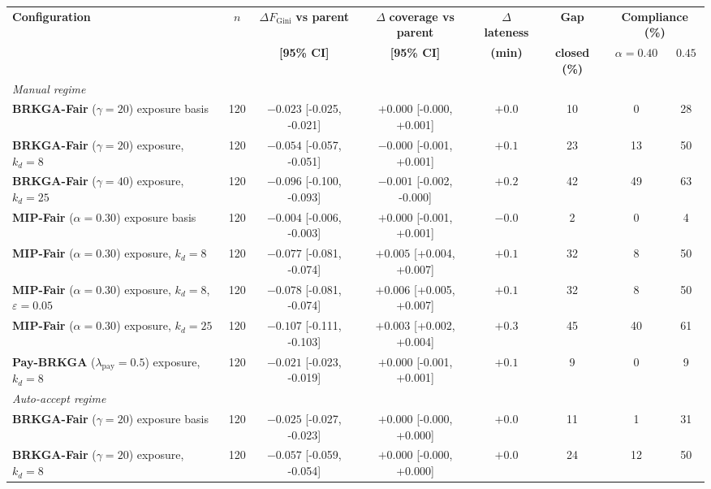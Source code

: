 \documentclass[a4paper,11pt,review,3p,authoryear]{elsarticle}
\newcommand{\FG}{F_{\text{Gini}}}
\begin{document}
\begin{table}
\centering
\scriptsize
\begin{adjustbox}{max width=\textheight}
\setlength{\tabcolsep}{4pt}
\begin{tabular}{l|c|c|c|c|c|cc}
\hline
\multirow{2}{*}{\textbf{Configuration}} & \multirow{2}{*}{$n$} & $\Delta \FG$ \textbf{vs parent} & $\Delta$ \textbf{coverage vs parent} & $\Delta$ \textbf{lateness} & \textbf{Gap} & \multicolumn{2}{c}{\textbf{Compliance (\%)}} \\
 & & \textbf{[95\% CI]} & \textbf{[95\% CI]} & \textbf{(min)} & \textbf{closed (\%)} & $\alpha = 0.40$ & $0.45$ \\
\hline
\multicolumn{8}{l}{\textit{Manual regime}} \\
\textbf{BRKGA-Fair} ($\gamma = 20$) exposure basis & 120 & $-0.023$ [-0.025, -0.021] & $+0.000$ [-0.000, +0.001] & $+0.0$ & 10 & 0 & 28 \\
\textbf{BRKGA-Fair} ($\gamma = 20$) exposure, $k_d = 8$ & 120 & $-0.054$ [-0.057, -0.051] & $-0.000$ [-0.001, +0.001] & $+0.1$ & 23 & 13 & 50 \\
\textbf{BRKGA-Fair} ($\gamma = 40$) exposure, $k_d = 25$ & 120 & $-0.096$ [-0.100, -0.093] & $-0.001$ [-0.002, -0.000] & $+0.2$ & 42 & 49 & 63 \\
\textbf{MIP-Fair} ($\alpha = 0.30$) exposure basis & 120 & $-0.004$ [-0.006, -0.003] & $+0.000$ [-0.001, +0.001] & $-0.0$ & 2 & 0 & 4 \\
\textbf{MIP-Fair} ($\alpha = 0.30$) exposure, $k_d = 8$ & 120 & $-0.077$ [-0.081, -0.074] & $+0.005$ [+0.004, +0.007] & $+0.1$ & 32 & 8 & 50 \\
\textbf{MIP-Fair} ($\alpha = 0.30$) exposure, $k_d = 8$, $\varepsilon = 0.05$ & 120 & $-0.078$ [-0.081, -0.074] & $+0.006$ [+0.005, +0.007] & $+0.1$ & 32 & 8 & 50 \\
\textbf{MIP-Fair} ($\alpha = 0.30$) exposure, $k_d = 25$ & 120 & $-0.107$ [-0.111, -0.103] & $+0.003$ [+0.002, +0.004] & $+0.3$ & 45 & 40 & 61 \\
\textbf{Pay-BRKGA} ($\lambda_{\text{pay}} = 0.5$) exposure, $k_d = 8$ & 120 & $-0.021$ [-0.023, -0.019] & $+0.000$ [-0.001, +0.001] & $+0.1$ & 9 & 0 & 9 \\
\hline
\multicolumn{8}{l}{\textit{Auto-accept regime}} \\
\textbf{BRKGA-Fair} ($\gamma = 20$) exposure basis & 120 & $-0.025$ [-0.027, -0.023] & $+0.000$ [-0.000, +0.000] & $+0.0$ & 11 & 1 & 31 \\
\textbf{BRKGA-Fair} ($\gamma = 20$) exposure, $k_d = 8$ & 120 & $-0.057$ [-0.059, -0.054] & $+0.000$ [-0.000, +0.000] & $+0.0$ & 24 & 12 & 50 \\

\end{tabular}
\end{adjustbox}
\end{table}
\end{document}
